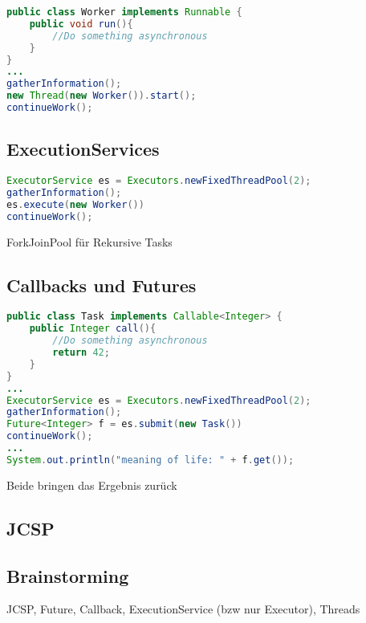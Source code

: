 \begin{lstlisting}[language=Java,caption=Definition und Erzeugung eines Threads,label=lst:java_thread]
public class Worker implements Runnable {
	public void run(){
		//Do something asynchronous 	
	}
}
...
gatherInformation();
new Thread(new Worker()).start(); 
continueWork();
\end{lstlisting}


\subsection{ExecutionServices}

\begin{lstlisting}[language=Java,caption=Verwendung eines ExecutionServices,label=lst:java_executionservice]
ExecutorService es = Executors.newFixedThreadPool(2);
gatherInformation();
es.execute(new Worker())
continueWork();
\end{lstlisting}

ForkJoinPool für Rekursive Tasks

\subsection{Callbacks und Futures}
\begin{lstlisting}[language=Java,caption=Verwendung von Futures,label=lst:java_futures]
public class Task implements Callable<Integer> {
	public Integer call(){
		//Do something asynchronous
		return 42; 	
	}
}
...
ExecutorService es = Executors.newFixedThreadPool(2);
gatherInformation();
Future<Integer> f = es.submit(new Task())
continueWork();
...
System.out.println("meaning of life: " + f.get());


\end{lstlisting}
Beide bringen das Ergebnis zurück


\subsection{JCSP}

\subsection{Brainstorming}
JCSP, Future, Callback, ExecutionService (bzw nur Executor), Threads
